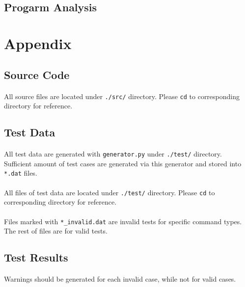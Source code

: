 \documentclass{article}
\begin{document}
        \subsection{Progarm Analysis}
            
    \cleardoublepage
    \section{Appendix}
        \subsection{Source Code}
            \paragraph{}
                All source files are located under \texttt{./src/} directory. Please \texttt{cd}
                to corresponding directory for reference.
        \subsection{Test Data}
            \paragraph{}
                All test data are generated with \texttt{generator.py} under \texttt{./test/}
                directory. Sufficient amount of test cases are generated via this generator
                and stored into \texttt{*.dat} files.
            \paragraph{}
                All files of test data are located under \texttt{./test/} directory. Please
                \texttt{cd} to corresponding directory for reference.
            \paragraph{}
                Files marked with \texttt{*\_invalid.dat} are invalid tests for specific command
                types. The rest of files are for valid tests.
        \subsection{Test Results}
            \paragraph{}
                Warnings should be generated for each invalid case, while not for valid cases. 
\end{document}

